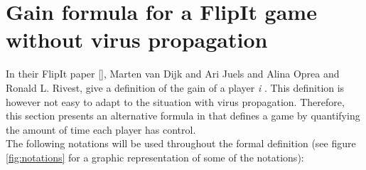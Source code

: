 \section{Gain formula for a FlipIt game without virus propagation}
\label{ch:8:GainFlip}
In their FlipIt paper [], Marten van Dijk and Ari Juels and Alina Oprea and Ronald L. Rivest, give a definition of the gain of a player \textit{i} . This definition is however not easy to adapt to the situation with virus propagation. Therefore, this section presents an alternative formula in that defines a game by quantifying the amount of time each player has control. \\


The following notations will be used throughout the formal definition (see figure \ref{fig:notations} for a graphic representation of some of the notations):


